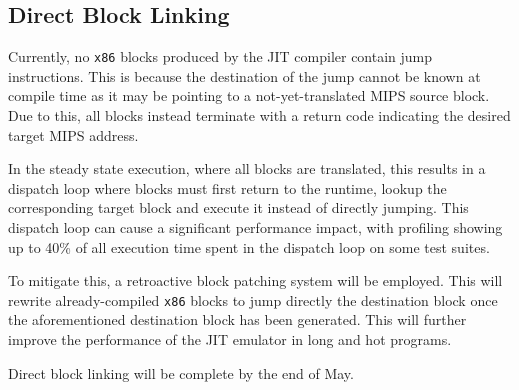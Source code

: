\subsection{Direct Block Linking}


Currently, no \texttt{x86} blocks produced by the JIT compiler contain jump instructions. This is because the destination of the jump cannot be known at compile time as it may be pointing to a not-yet-translated MIPS source block. Due to this, all blocks instead terminate with a return code indicating the desired target MIPS address.

In the steady state execution, where all blocks are translated, this results in a dispatch loop where blocks must first return to the runtime, lookup the corresponding target block and execute it instead of directly jumping. This dispatch loop can cause a significant performance impact, with profiling showing up to 40\% of all execution time spent in the dispatch loop on some test suites.

To mitigate this, a retroactive block patching system will be employed. This will rewrite already-compiled \texttt{x86} blocks to jump directly the destination block once the aforementioned destination block has been generated. This will further improve the performance of the JIT emulator in long and hot programs.

Direct block linking will be complete by the end of May.
